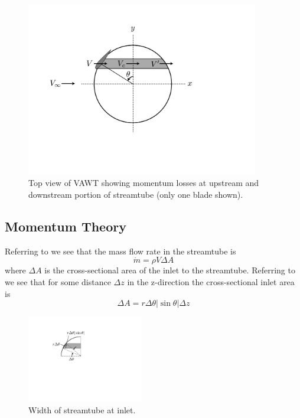 \documentclass{article}
\begin{document}
\begin{figure}[htbp]
\begin{center}
\includegraphics[width=4in]{images/top}
\caption{Top view of VAWT showing momentum losses at upstream and downstream portion of streamtube (only one blade shown).}
\label{fig:top}
\end{center}
\end{figure}

\subsection{Momentum Theory}
Referring to  we see that the mass flow rate in the streamtube is
\begin{equation}
\dot{m} = \rho V \Delta A
\end{equation}
where $\Delta A$ is the cross-sectional area of the inlet to the streamtube.  Referring to  we see that for some distance $\Delta z$ in the z-direction the cross-sectional inlet area is
\begin{equation}
\Delta A = r \Delta \theta |\sin\theta| \Delta z
\label{eq:deltaA}
\end{equation}

\begin{figure}[htbp]
\begin{center}
\includegraphics[width=2in]{images/da}
\caption{Width of streamtube at inlet.}
\label{fig:da}
\end{center}
\end{figure}
\end{document}
